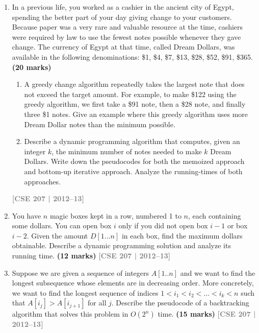 \documentclass[12pt,a3paper]{article}
\newcommand{\yr}[1]{\hfill\textcolor{gray}{\small\textbf{[#1]}}}
\newcommand{\mk}[1]{\textcolor{orange!70!black}{\small\textbf{(#1 marks)}}}
\begin{document}
\begin{enumerate}
\item In a previous life, you worked as a cashier in the ancient city of Egypt, spending the better part of your day giving change to your customers. Because paper was a very rare and valuable resource at the time, cashiers were required by law to use the fewest notes possible whenever they gave change. The currency of Egypt at that time, called Dream Dollars, was available in the following denominations: \$1, \$4, \$7, \$13, \$28, \$52, \$91, \$365. \mk{20}
\begin{enumerate}
  \item A greedy change algorithm repeatedly takes the largest note that does not exceed the target amount. For example, to make \$122 using the greedy algorithm, we first take a \$91 note, then a \$28 note, and finally three \$1 notes. Give an example where this greedy algorithm uses more Dream Dollar notes than the minimum possible.
  \item Describe a dynamic programming algorithm that computes, given an integer $k$, the minimum number of notes needed to make $k$ Dream Dollars. Write down the pseudocodes for both the memoized approach and bottom-up iterative approach. Analyze the running-times of both approaches.
\end{enumerate}
\yr{CSE 207 | 2012--13}

\item You have $n$ magic boxes kept in a row, numbered 1 to $n$, each containing some dollars. You can open box $i$ only if you did not open box $i-1$ or box $i-2$. Given the amount $D[1 \ldots n]$ in each box, find the maximum dollars obtainable. Describe a dynamic programming solution and analyze its running time. \mk{12}
\yr{CSE 207 | 2012--13}

\item Suppose we are given a sequence of integers $A[1..n]$ and we want to find the longest subsequence whose elements are in decreasing order. More concretely, we want to find the longest sequence of indices $1 < i_1 < i_2 < \ldots < i_k < n$ such that $A[i_j] > A[i_{j+1}]$ for all $j$. Describe the pseudocode of a backtracking algorithm that solves this problem in $O(2^n)$ time. \mk{15}
\yr{CSE 207 | 2012--13}


\end{enumerate}
\end{document}
